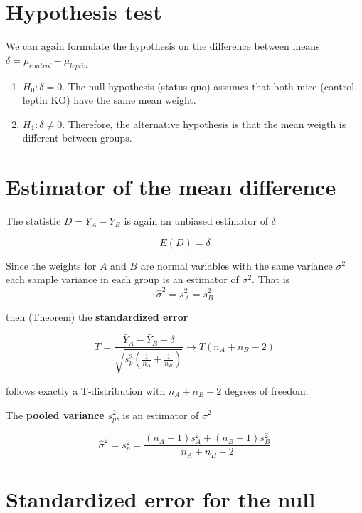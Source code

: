 \documentclass[
]{book}
\begin{document}
\hypertarget{hypothesis-test-1}{%
\section{Hypothesis test}\label{hypothesis-test-1}}

We can again formulate the hypothesis on the difference between means \(\delta=\mu_{control} -\mu_{leptin}\)

\begin{enumerate}
\def\labelenumi{\alph{enumi}.}
\item
  \(H_0: \delta=0\). The null hypothesis (status quo) assumes that both mice (control, leptin KO) have the same mean weight.
\item
  \(H_1: \delta \neq 0\). Therefore, the alternative hypothesis is that the mean weigth is different between groups.
\end{enumerate}

\hypertarget{estimator-of-the-mean-difference}{%
\section{Estimator of the mean difference}\label{estimator-of-the-mean-difference}}

The statistic \(D=\bar{Y}_A-\bar{Y}_B\) is again an unbiased estimator of \(\delta\)

\[E(D)=\delta\]

Since the weights for \(A\) and \(B\) are normal variables with the same variance \(\sigma^2\) each sample variance in each group is an estimator of \(\sigma^2\). That is \[\hat{\sigma}^2=s^2_A=s^2_B\]

then (Theorem) the \textbf{standardized error}

\[T=\frac{\bar{Y}_A-\bar{Y}_B -\delta}{\sqrt{s_p^2(\frac{1}{n_A}+\frac{1}{n_B})}} \rightarrow T(n_A+n_B-2)\]

follows exactly a T-distribution with \(n_A+n_B-2\) degrees of freedom.

The \textbf{pooled variance} \(s_p^2\), is an estimator of \(\sigma^2\)

\[\hat{\sigma}^2=s_p^2= \frac{(n_A-1) s^2_A+(n_B-1) s^2_B}{n_A+n_B-2}\]

\hypertarget{standardized-error-for-the-null-1}{%
\section{Standardized error for the null}\label{standardized-error-for-the-null-1}}
\end{document}
